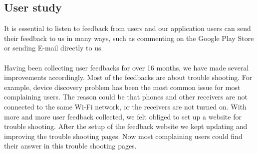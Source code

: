 \subsection{User study}
It is essential to listen to feedback from users and our application users can send their feedback to us in many ways, such as commenting on the Google Play Store or sending E-mail directly to us.\\
\\
Having been collecting user feedbacks for over 16 months, we have made several improvements accordingly. Most of the feedbacks are about trouble shooting. For example, device discovery problem has been the most common issue for most complaining users. The reason could be that phones and other receivers are not connected to the same Wi-Fi network, or the receivers are not turned on. With more and more user feedback collected, we felt obliged to set up a website for trouble shooting. After the setup of the feedback website we kept updating and improving the trouble shooting pages. Now most complaining users could find their answer in this trouble shooting pages.
